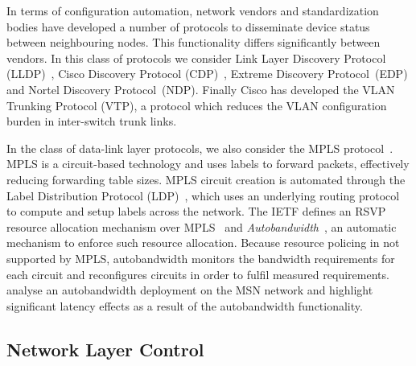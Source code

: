 In terms of configuration automation, network vendors and standardization bodies
have developed a number of protocols to disseminate device status between
neighbouring nodes. This functionality differs significantly between vendors.
In this class of protocols we consider Link Layer Discovery Protocol
(LLDP)~, Cisco Discovery Protocol
(CDP)~,  Extreme Discovery Protocol~(EDP) and Nortel Discovery
Protocol~(NDP). Finally Cisco has developed the VLAN Trunking Protocol (VTP), a
protocol which reduces the VLAN configuration burden in inter-switch trunk
links.

In the class of data-link layer protocols, we also consider the MPLS
protocol~.  MPLS is a circuit-based technology and uses labels
to forward packets, effectively reducing forwarding table sizes.  MPLS circuit
creation is automated through the Label Distribution Protocol
(LDP)~, which uses an underlying routing protocol to compute
and setup labels across the network. The IETF defines an RSVP resource
allocation mechanism over MPLS~ and
\textit{Autobandwidth}~, an automatic mechanism to enforce
such resource allocation.  Because resource policing in not supported by MPLS,
autobandwidth monitors the bandwidth requirements for each circuit and
reconfigures circuits in order to fulfil measured requirements.
 analyse an autobandwidth deployment on the MSN network and
highlight significant latency effects as a result of the autobandwidth
functionality.


\subsection{Network Layer Control}

